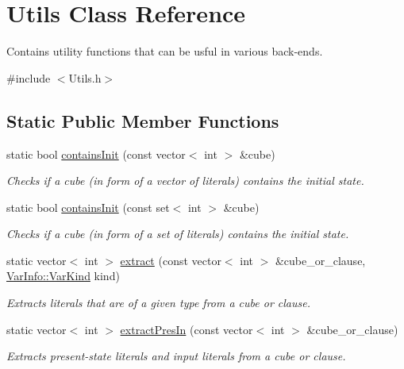 \hypertarget{classUtils}{\section{Utils Class Reference}
\label{classUtils}
}


Contains utility functions that can be usful in various back-\/ends.  




{\ttfamily \#include $<$Utils.\-h$>$}

\subsection*{Static Public Member Functions}
\begin{DoxyCompactItemize}
\item 
static bool \hyperlink{classUtils_adef5db58221c7a04397de10ec0b13fb6}{contains\-Init} (const vector$<$ int $>$ \&cube)
\begin{DoxyCompactList}\small\item\em Checks if a cube (in form of a vector of literals) contains the initial state. \end{DoxyCompactList}\item 
static bool \hyperlink{classUtils_a02ae74e9866b8ca0863c9507e46df007}{contains\-Init} (const set$<$ int $>$ \&cube)
\begin{DoxyCompactList}\small\item\em Checks if a cube (in form of a set of literals) contains the initial state. \end{DoxyCompactList}\item 
static vector$<$ int $>$ \hyperlink{classUtils_a9eb9e182ca1da6a1050338928083f632}{extract} (const vector$<$ int $>$ \&cube\-\_\-or\-\_\-clause, \hyperlink{classVarInfo_a64d1da76cf84fe674e5fef9764ef11cf}{Var\-Info\-::\-Var\-Kind} kind)
\begin{DoxyCompactList}\small\item\em Extracts literals that are of a given type from a cube or clause. \end{DoxyCompactList}\item 
static vector$<$ int $>$ \hyperlink{classUtils_a9c060a97bf0e9e5e08bf33b512633ac3}{extract\-Pres\-In} (const vector$<$ int $>$ \&cube\-\_\-or\-\_\-clause)
\begin{DoxyCompactList}\small\item\em Extracts present-\/state literals and input literals from a cube or clause. \end{DoxyCompactList}\item 

\end{DoxyCompactItemize}
